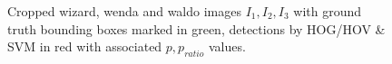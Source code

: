 \documentclass[11pt]{article}
\begin{document}
\begin{figure}
    \centering
    \begin{subfigure}{0.3\linewidth}
    \end{subfigure}
    \begin{subfigure}{0.3\linewidth}
    \end{subfigure}
    \begin{subfigure}{0.3\linewidth}
    \end{subfigure}
    \caption{Cropped wizard, wenda and waldo images \( I_1, I_2, I_3 \) with ground truth bounding boxes marked in green, 
    detections by HOG/HOV \& SVM in red with associated \( p, p_{ratio} \) values.}
    \label{fig:detections}
\end{figure}
\end{document}
